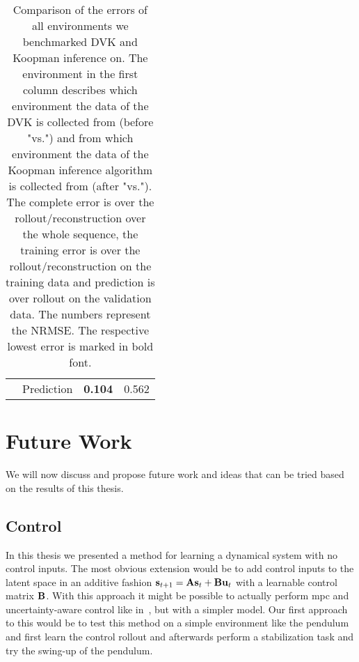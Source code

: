 \begin{table}
\begin{tabular}{c|c|c|c}
				                              &       Prediction       &          \textbf{0.104}           &           0.562
			\end{tabular}
			\caption[Comparison of the errors of all environment we benchmarked DVK and Koopman inference on]{Comparison of the errors of all environments we benchmarked DVK and Koopman inference on. The environment in the first column describes which environment the data of the DVK is collected from (before "vs.") and from which environment the data of the Koopman inference algorithm is collected from (after "vs."). The complete error is over the rollout/reconstruction over the whole sequence, the training error is over the rollout/reconstruction on the training data and prediction is over rollout on the validation data. The numbers represent the NRMSE. The respective lowest error is marked in bold font.}
			\label{tab:mortonComparison}
		\end{table}

%

\section{Future Work}
	\label{sec:futureWork}

	We will now discuss and propose future work and ideas that can be tried based on the results of this thesis.

	\subsection{Control}
		In this thesis we presented a method for learning a dynamical system with no control inputs. The most obvious extension would be to add control inputs to the latent space in an additive fashion \( \boldsymbol{\mathrm{s}}_{t + 1} = \boldsymbol{\mathrm{A}} \boldsymbol{\mathrm{s}}_t + \boldsymbol{\mathrm{B}} \boldsymbol{\mathrm{u}}_t \) with a learnable control matrix \(\boldsymbol{\mathrm{B}}\). With this approach it might be possible to actually perform \ac{mpc} and uncertainty-aware control like in~\cite{mortonDeepVariationalKoopman2019a}, but with a simpler model. Our first approach to this would be to test this method on a simple environment like the pendulum and first learn the control rollout and afterwards perform a stabilization task and try the swing-up of the pendulum.

